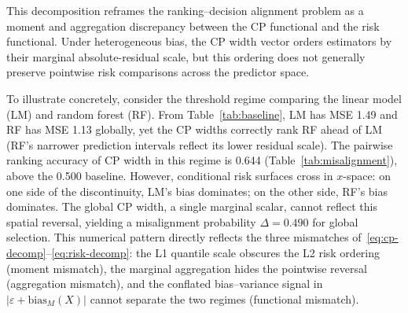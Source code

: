 \documentclass[a4paper,11pt]{article}
\begin{document}
This decomposition reframes the ranking--decision alignment problem as a moment and aggregation discrepancy between the CP functional and the risk functional. Under heterogeneous bias, the CP width vector orders estimators by their marginal absolute-residual scale, but this ordering does not generally preserve pointwise risk comparisons across the predictor space.

To illustrate concretely, consider the threshold regime comparing the linear model (LM) and random forest (RF). From Table~\ref{tab:baseline}, LM has MSE 1.49 and RF has MSE 1.13 globally, yet the CP widths correctly rank RF ahead of LM (RF's narrower prediction intervals reflect its lower residual scale). The pairwise ranking accuracy of CP width in this regime is 0.644 (Table~\ref{tab:misalignment}), above the 0.500 baseline. However, conditional risk surfaces cross in $x$-space: on one side of the discontinuity, LM's bias dominates; on the other side, RF's bias dominates. The global CP width, a single marginal scalar, cannot reflect this spatial reversal, yielding a misalignment probability $\Delta = 0.490$ for global selection. This numerical pattern directly reflects the three mismatches of~\eqref{eq:cp-decomp}--\eqref{eq:risk-decomp}: the L1 quantile scale obscures the L2 risk ordering (moment mismatch), the marginal aggregation hides the pointwise reversal (aggregation mismatch), and the conflated bias--variance signal in $|\varepsilon + \text{bias}_M(X)|$ cannot separate the two regimes (functional mismatch).
\end{document}
